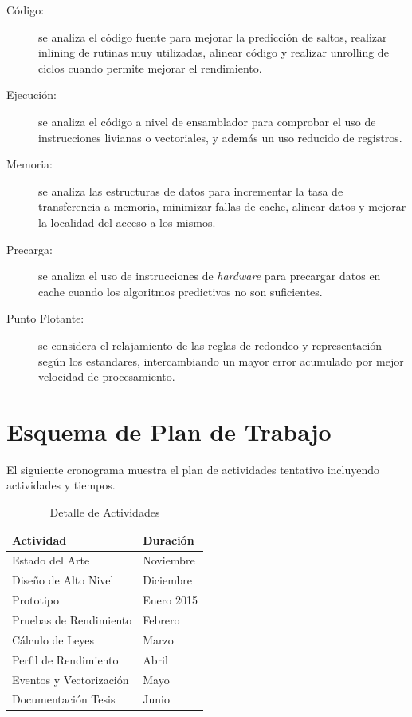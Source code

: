\documentclass[a4paper]{article}
\begin{document}
\begin{description}
\item[Código:] se analiza el código fuente para mejorar la predicción de saltos, realizar inlining de rutinas muy utilizadas, alinear código y realizar unrolling de ciclos cuando permite mejorar el rendimiento.
\item[Ejecución:] se analiza el código a nivel de ensamblador para comprobar el uso de instrucciones livianas o vectoriales, y además un uso reducido de registros.
\item[Memoria:] se analiza las estructuras de datos para incrementar la tasa de transferencia a memoria, minimizar fallas de cache, alinear datos y mejorar la localidad del acceso a los mismos.
\item[Precarga:] se analiza el uso de instrucciones de {\it hardware} para precargar datos en cache cuando los algoritmos predictivos no son suficientes.
\item[Punto Flotante:] se considera el relajamiento de las reglas de redondeo y representación según los estandares, intercambiando un mayor error acumulado por mejor velocidad de procesamiento.
\end{description}

\section{Esquema de Plan de Trabajo}

El siguiente cronograma muestra el plan de actividades tentativo incluyendo actividades y tiempos.

\begin{table}[H]
  \caption{Detalle de Actividades}
  \centering
    \begin{tabular}{|l|l|}\hline
      {\bf Actividad} & {\bf Duración} \\ \hline
      Estado del Arte & Noviembre \\ \hline
      Diseño de Alto Nivel & Diciembre \\ \hline
      Prototipo & Enero 2015 \\ \hline
      Pruebas de Rendimiento & Febrero \\ \hline
      Cálculo de Leyes & Marzo \\ \hline
      Perfil de Rendimiento & Abril \\ \hline
      Eventos y Vectorización & Mayo \\ \hline
      Documentación Tesis & Junio \\ \hline
    \end{tabular}
  \label{schedule}
\end{table}
\end{document}
